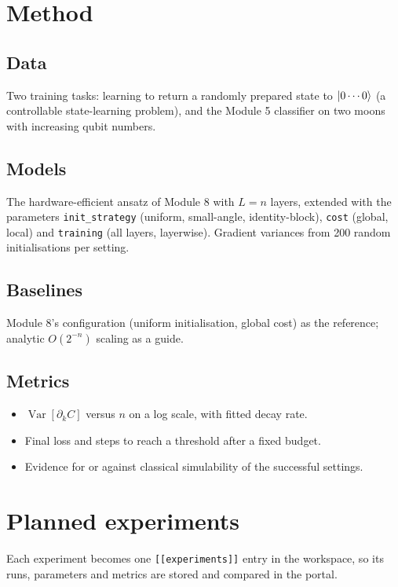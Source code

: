 \documentclass[11pt,a4paper]{article}
\begin{document}
\section{Method}
\subsection{Data}
Two training tasks: learning to return a randomly prepared state to $\ket{0\cdots0}$ (a controllable
state-learning problem), and the Module 5 classifier on two moons with increasing qubit numbers.

\subsection{Models}
The hardware-efficient ansatz of Module 8 with $L=n$ layers, extended with the parameters
\texttt{init\_strategy} (uniform, small-angle, identity-block), \texttt{cost} (global, local) and
\texttt{training} (all layers, layerwise). Gradient variances from 200 random initialisations per setting.

\subsection{Baselines}
Module 8's configuration (uniform initialisation, global cost) as the reference; analytic
$O(2^{-n})$ scaling as a guide.

\subsection{Metrics}
\begin{itemize}
  \item $\operatorname{Var}[\partial_kC]$ versus $n$ on a log scale, with fitted decay rate.
  \item Final loss and steps to reach a threshold after a fixed budget.
  \item Evidence for or against classical simulability of the successful settings.
\end{itemize}

\section{Planned experiments}
Each experiment becomes one \texttt{[[experiments]]} entry in the workspace, so its runs, parameters
and metrics are stored and compared in the portal.
\end{document}
